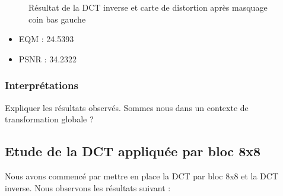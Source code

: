 \documentclass[12pt]{report}
\begin{document}
\begin{figure}[H]
\begin{center}
\caption{Résultat de la DCT inverse et carte de distortion après masquage coin bas gauche}
\end{center}
\end{figure}

\begin{itemize}
\item EQM : 24.5393
\item PSNR : 34.2322
\end{itemize}

\subsubsection{Interprétations}
Expliquer les résultats observés.
Sommes nous dans un contexte de transformation globale ?

\subsection{Etude de la DCT appliquée par bloc 8x8}
Nous avons commencé par mettre en place la DCT par bloc 8x8 et la DCT inverse. Nous observons les résultats suivant :
\end{document}

